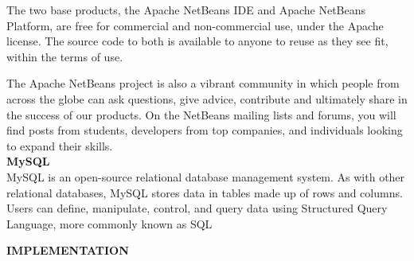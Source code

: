 \documentclass[a4paper,12pt]{report}
\begin{document}
The two base products, the Apache NetBeans IDE and Apache NetBeans Platform, are free for commercial and non-commercial use, under the Apache license. The source code to both is available to anyone to reuse as they see fit, within the terms of use.

The Apache NetBeans project is also a vibrant community in which people from across the globe can ask questions, give advice, contribute and ultimately share in the success of our products. On the NetBeans mailing lists and forums, you will find posts from students, developers from top companies, and individuals looking to expand their skills.
\\

\textbf{MySQL}\\
MySQL is an open-source relational database management system. As with other relational databases, MySQL stores data in tables made up of rows and columns. Users can define, manipulate, control, and query data using Structured Query Language, more commonly known as SQL
\begin{flushleft}
		\textbf{IMPLEMENTATION} 
\end{flushleft} 
\end{document}
